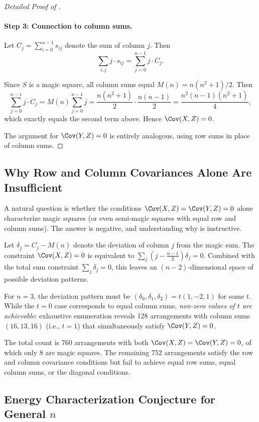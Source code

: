 \begin{proof}[Detailed Proof of ]
\paragraph{Step 3: Connection to column sums.}
Let $C_j = \sum_{i=0}^{n-1} s_{ij}$ denote the sum of column $j$. Then
\[
\sum_{i,j} j \cdot s_{ij} = \sum_{j=0}^{n-1} j \cdot C_j.
\]

Since $S$ is a magic square, all column sums equal $M(n) = n(n^2+1)/2$.
Then
\[
\sum_{j=0}^{n-1} j \cdot C_j = M(n) \sum_{j=0}^{n-1} j = \frac{n(n^2+1)}{2} \cdot \frac{n(n-1)}{2} = \frac{n^2(n-1)(n^2+1)}{4},
\]
which exactly equals the second term above. Hence $\Cov(X, Z) = 0$.

The argument for $\Cov(Y, Z) = 0$ is entirely analogous, using row sums in place of column sums.
\end{proof}

\subsection{Why Row and Column Covariances Alone Are Insufficient}

A natural question is whether the conditions $\Cov(X, Z) = \Cov(Y, Z) = 0$ alone 
characterize magic squares (or even semi-magic squares with equal row and column sums).
The answer is negative, and understanding why is instructive.

Let $\delta_j = C_j - M(n)$ denote the deviation of column $j$ from the magic sum.
The constraint $\Cov(X, Z) = 0$ is equivalent to $\sum_j (j - \frac{n-1}{2}) \delta_j = 0$.
Combined with the total sum constraint $\sum_j \delta_j = 0$, this leaves an $(n-2)$-dimensional 
space of possible deviation patterns.

For $n = 3$, the deviation pattern must be $(\delta_0, \delta_1, \delta_2) = t(1, -2, 1)$ for some $t$.
While the $t = 0$ case corresponds to equal column sums, \emph{non-zero values of $t$ are achievable}:
exhaustive enumeration reveals 128 arrangements with column sums $(16, 13, 16)$ (i.e., $t = 1$)
that simultaneously satisfy $\Cov(Y, Z) = 0$.

The total count is 760 arrangements with both $\Cov(X, Z) = \Cov(Y, Z) = 0$,
of which only 8 are magic squares.
The remaining 752 arrangements satisfy the row and column covariance conditions 
but fail to achieve equal row sums, equal column sums, or the diagonal conditions.

\subsection{Energy Characterization Conjecture for General $n$}

